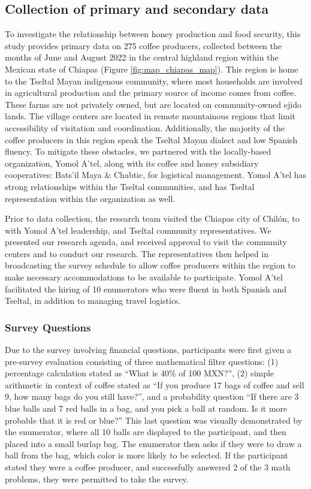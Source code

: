 \documentclass[../main.tex]{subfiles}
\begin{document}
\subsection{Collection of primary and secondary data}

To investigate the relationship between honey production and food security, this study provides primary data on 275 coffee producers, collected between the months of June and August 2022 in the central highland region within the Mexican state of Chiapas (Figure \ref{fig:map_chiapas_map}). This region is home to the Tseltal Mayan indigenous community, where most households are involved in agricultural production and the primary source of income comes from coffee. These farms are not privately owned, but are located on community-owned ejido lands. The village centers are located in remote mountainous regions that limit accessibility of visitation and coordination. Additionally, the majority of the coffee producers in this region speak the Tseltal Mayan dialect and low Spanish fluency. To mitigate these obstacles, we partnered with the locally-based organization, Yomol A’tel, along with its coffee and honey subsidiary cooperatives: Bats’il Maya \& Chabtic,  for logistical management. Yomol A’tel has strong relationships within the Tseltal communities, and has Tseltal representation within the organization as well. 

Prior to data collection, the research team visited the Chiapas city of Chilón, to with Yomol A’tel leadership, and Tseltal community representatives. We presented our research agenda, and received approval to visit the community centers and to conduct our research. The representatives then helped in broadcasting the survey schedule to allow coffee producers within the region to make necessary accommodations to be available to participate. Yomol A'tel facilitated the hiring of 10 enumerators who were fluent in both Spanish and Tseltal, in addition to managing travel logistics.  

\subsubsection{Survey Questions}

Due to the survey involving financial questions, participants were first given a pre-survey evaluation consisting of three mathematical filter questions: (1) percentage calculation stated as “What is 40\% of 100 MXN?”, (2) simple arithmetic in context of coffee stated as “If you produce 17 bags of coffee and sell 9, how many bags do you still have?”, and a probability question “If there are 3 blue balls and 7 red balls in a bag, and you pick a ball at random. Is it more probable that it is red or blue?” This last question was visually demonstrated by the enumerator, where all 10 balls are displayed to the participant, and then placed into a small burlap bag. The enumerator then asks if they were to draw a ball from the bag, which color is more likely to be selected.  If the participant stated they were a coffee producer, and successfully answered 2 of the 3 math problems, they were permitted to take the survey.
\end{document}
